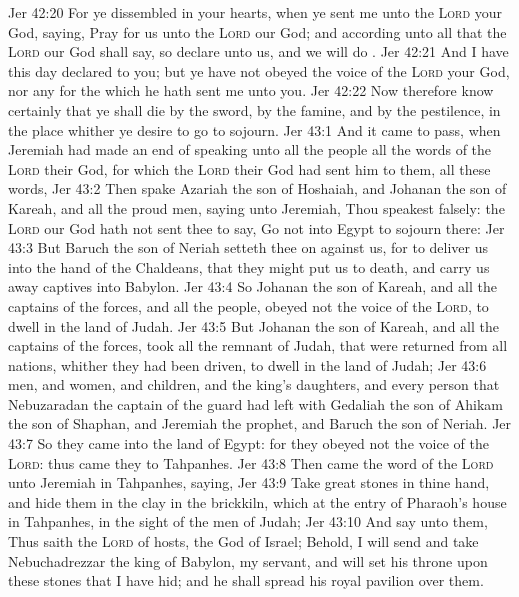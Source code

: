 \vs Jer 42:20 For ye dissembled in your hearts, when ye sent me unto the \textsc{Lord} your God, saying, Pray for us unto the \textsc{Lord} our God; and according unto all that the \textsc{Lord} our God shall say, so declare unto us, and we will do .
\vs Jer 42:21 And  I have this day declared  to you; but ye have not obeyed the voice of the \textsc{Lord} your God, nor any  for the which he hath sent me unto you.
\vs Jer 42:22 Now therefore know certainly that ye shall die by the sword, by the famine, and by the pestilence, in the place whither ye desire to go  to sojourn.
\vs Jer 43:1 And it came to pass,  when Jeremiah had made an end of speaking unto all the people all the words of the \textsc{Lord} their God, for which the \textsc{Lord} their God had sent him to them,  all these words,
\vs Jer 43:2 Then spake Azariah the son of Hoshaiah, and Johanan the son of Kareah, and all the proud men, saying unto Jeremiah, Thou speakest falsely: the \textsc{Lord} our God hath not sent thee to say, Go not into Egypt to sojourn there:
\vs Jer 43:3 But Baruch the son of Neriah setteth thee on against us, for to deliver us into the hand of the Chaldeans, that they might put us to death, and carry us away captives into Babylon.
\vs Jer 43:4 So Johanan the son of Kareah, and all the captains of the forces, and all the people, obeyed not the voice of the \textsc{Lord}, to dwell in the land of Judah.
\vs Jer 43:5 But Johanan the son of Kareah, and all the captains of the forces, took all the remnant of Judah, that were returned from all nations, whither they had been driven, to dwell in the land of Judah;
\vs Jer 43:6  men, and women, and children, and the king's daughters, and every person that Nebuzaradan the captain of the guard had left with Gedaliah the son of Ahikam the son of Shaphan, and Jeremiah the prophet, and Baruch the son of Neriah.
\vs Jer 43:7 So they came into the land of Egypt: for they obeyed not the voice of the \textsc{Lord}: thus came they  to Tahpanhes.
\vs Jer 43:8 Then came the word of the \textsc{Lord} unto Jeremiah in Tahpanhes, saying,
\vs Jer 43:9 Take great stones in thine hand, and hide them in the clay in the brickkiln, which  at the entry of Pharaoh's house in Tahpanhes, in the sight of the men of Judah;
\vs Jer 43:10 And say unto them, Thus saith the \textsc{Lord} of hosts, the God of Israel; Behold, I will send and take Nebuchadrezzar the king of Babylon, my servant, and will set his throne upon these stones that I have hid; and he shall spread his royal pavilion over them.
